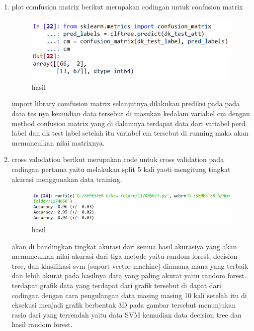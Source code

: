 \begin{enumerate}
\item plot comfusion matrix
berikut merupakan codingan untuk confusion matrix 

\begin{figure}[ht]
\centering
\includegraphics[scale=0.5]{figures/1174050/chapter4/11.PNG}
\caption{hasil}
\label{Praktek no 6}
\end{figure}
import library comfusion matrix selanjutnya dilakukan prediksi pada pada data tes nya kemudian data tersebut di masukan kedalam variabel cm dengan method confusion matrix yang di dalamnya terdapat data dari variabel perd label dan dk test label setelah itu variabel cm tersebut di running maka akan memunculkan nilai matrixnya. 

\item cross valodation 
berikut merupakan code untuk cross validation pada codingan pertama yaitu melakukan split 5 kali yaoti mengitung tingkat akurasi menggunakan data training.

\begin{figure}[ht]
\centering
\includegraphics[scale=0.5]{figures/1174050/chapter4/12.PNG}
\caption{hasil}
\label{Praktek no 7}
\end{figure}
akan di bandingkan tingkat akurasi dari semua hasil akurasiya yang akan memunculkan nilai akurasi dari tiga metode yaitu random forest, decision tree, dan klasifikasi svm (suport vector machine) diamana mana yang terbaik dan lebih akurat pada hasilnya data yang paling akurat yaitu random forest. terdapat grafik data yang terdapat dari grafik tersebut di dapat dari codingan dengan cara pengulangan data masing masing 10 kali setelah itu di eksekusi menjadi grafik berbentuk 3D pada gambar tersebut menunjukan rasio dari yang terrendah yaitu data SVM kemudian data decision tree dan hasil random forest.



\end{enumerate}
